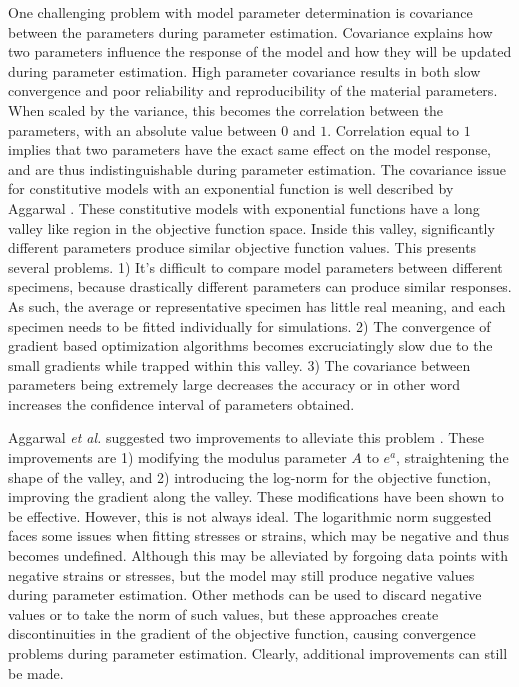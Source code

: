 	One challenging problem with model parameter determination is covariance between the parameters during parameter estimation. Covariance explains how two parameters influence the response of the model and how they will be updated during parameter estimation. High parameter covariance results in both slow convergence and poor reliability and reproducibility of the material parameters. When scaled by the variance, this becomes the correlation between the parameters, with an absolute value between $0$ and $1$. Correlation equal to $1$ implies that two parameters have the exact same effect on the model response, and are thus indistinguishable during parameter estimation. The covariance issue for constitutive models with an exponential function is well described by Aggarwal \cite{aggarwal_inverse_2015, aggarwal_improved_2017}. These constitutive models with exponential functions have a long valley like region in the objective function space. Inside this valley, significantly different parameters produce similar objective function values. This presents several problems. 1) It's difficult to compare model parameters between different specimens, because drastically different parameters can produce similar responses. As such, the average or representative specimen has little real meaning, and each specimen needs to be fitted individually for simulations. 2) The convergence of gradient based optimization algorithms becomes excruciatingly slow due to the small gradients while trapped within this valley. 3) The covariance between parameters being extremely large decreases the accuracy or in other word increases the confidence interval of parameters obtained. 
    
    Aggarwal \textit{et al.} suggested two improvements to alleviate this problem \cite{aggarwal_improved_2017}. These improvements are 1) modifying the modulus parameter $A$ to $e^{a}$, straightening the shape of the valley, and 2) introducing the log-norm for the objective function, improving the gradient along the valley. These modifications have been shown to be effective. However, this is not always ideal. The logarithmic norm suggested faces some issues when fitting stresses or strains, which may be negative and thus becomes undefined. Although this may be alleviated by forgoing data points with negative strains or stresses, but the model may still produce negative values during parameter estimation. Other methods can be used to discard negative values or to take the norm of such values, but these approaches create discontinuities in the gradient of the objective function, causing convergence problems during parameter estimation. Clearly, additional improvements can still be made. 


